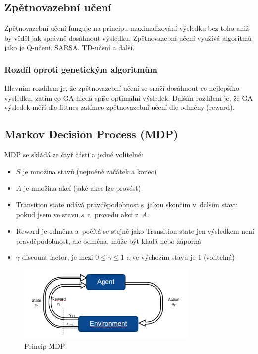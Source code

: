 \subsection{Zpětnovazební učení}

Zpětnovazební učení funguje na principu maximalizování výsledku bez toho aniž by věděl jak správně dosáhnout výsledku.
Zpětnovazební učení využívá algoritmů jako je Q-učení, SARSA, TD-učení a další.

\subsubsection{Rozdíl oproti genetickým algoritmům}

Hlavním rozdílem je, že zpětnovazební učení se snaží dosáhnout co nejlepšího výsledku, zatím co GA hledá spíše optimální výsledek.
Dalším rozdílem je, že GA výsledek měří dle fittnes zatímco zpětnovazební učení dle odměny (reward).

\subsection{Markov Decision Process (MDP)}

MDP se skládá ze čtyř částí a jedné volitelné:
\begin{itemize}
	\item $S$ je množina stavů (nejméně začátek a konec)
	\item $A$ je množina akcí (jaké akce lze provést)
	\item Transition state udává pravděpodobnost s~jakou skončím v~dalším stavu pokud jsem ve stavu $s$~a~provedu akci z~$A$. 
	\item Reward je odměna a~počítá se stejně jako Transition state jen výsledkem není pravděpodobnost, ale odměna, může být kladá nebo záporná
	\item $\gamma$ discount factor, je mezi $0 \leq \gamma \leq 1$ a ve výchozím stavu je 1 (volitelná)
\end{itemize}

\begin{figure}[h]
    \centering
	\includegraphics[height=10em]{images/10_MDP.png}
    \caption{Princip MDP}
    \label{mdp}
\end{figure}

